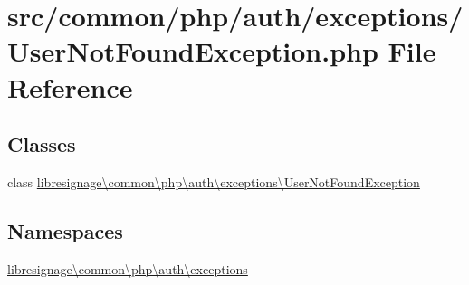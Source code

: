 \hypertarget{UserNotFoundException_8php}{}\section{src/common/php/auth/exceptions/\+User\+Not\+Found\+Exception.php File Reference}
\label{UserNotFoundException_8php}
\subsection*{Classes}
\begin{DoxyCompactItemize}
\item 
class \hyperlink{classlibresignage_1_1common_1_1php_1_1auth_1_1exceptions_1_1UserNotFoundException}{libresignage\textbackslash{}common\textbackslash{}php\textbackslash{}auth\textbackslash{}exceptions\textbackslash{}\+User\+Not\+Found\+Exception}
\end{DoxyCompactItemize}
\subsection*{Namespaces}
\begin{DoxyCompactItemize}
\item 
 \hyperlink{namespacelibresignage_1_1common_1_1php_1_1auth_1_1exceptions}{libresignage\textbackslash{}common\textbackslash{}php\textbackslash{}auth\textbackslash{}exceptions}
\end{DoxyCompactItemize}
